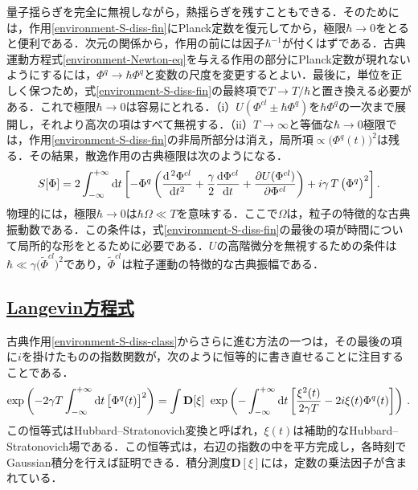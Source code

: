 \documentclass[a4paper,11pt]{ltjsarticle}
\newcommand{\subsectionlink}[1]{\subsection[#1]{\hyperlink{toc}{#1}}}
\def\d{\mathrm{d}}
\def\D{\mathbf{D}}
\begin{document}
量子揺らぎを完全に無視しながら，熱揺らぎを残すこともできる．そのためには，作用\eqref{environment-S-diss-fin}にPlanck定数を復元してから，極限$\hbar\to 0$をとると便利である．次元の関係から，作用の前には因子$\hbar^{-1}$が付くはずである．古典運動方程式\eqref{environment-Newton-eq}を与える作用の部分にPlanck定数が現れないようにするには，$\Phi^{q} \to \hbar
\Phi^{q}$と変数の尺度を変更するとよい．最後に，単位を正しく保つため，式\eqref{environment-S-diss-fin}の最終項で$T\to T/\hbar$と置き換える必要がある．これで極限$\hbar\to 0$は容易にとれる．（i）$U(\Phi^{cl}\pm \hbar\Phi^{q})$を$\hbar\Phi^{q}$の一次まで展開し，それより高次の項はすべて無視する．（ii）$T\to\infty$と等価な$\hbar\to0$極限では，作用\eqref{environment-S-diss-fin}の非局所部分は消え，局所項$\propto \big(\Phi^{q}(t)\big)^2$は残る．その結果，散逸作用の古典極限は次のようになる．
\begin{equation}\label{environment-S-diss-class}
S[\Phi]=2\int_{-\infty}^{+\infty}\d t\left[ -\Phi^{q}\left(
 {\d^{\,2} \Phi^{cl}\over \d t^2}+{\gamma\over 2}{\d
\Phi^{cl}\over \d t}+{\partial U(\Phi^{cl})\over
\partial \Phi^{cl} } \right)+i\gamma\, T\, \big(\Phi^{q}\big)^2 \right].
\end{equation}物理的には，極限$\hbar\to 0$は$\hbar\Omega\ll T$を意味する．ここで$\Omega$は，粒子の特徴的な古典振動数である．この条件は，式\eqref{environment-S-diss-fin}の最後の項が時間について局所的な形をとるために必要である．$U$の高階微分を無視するための条件は$\hbar\ll \gamma  \big(\tilde{\Phi}^{cl}\big)^2$であり，$\tilde\Phi^{cl}$は粒子運動の特徴的な古典振幅である．


\subsectionlink{Langevin方程式}\label{sec_environment-3}


古典作用\eqref{environment-S-diss-class}からさらに進む方法の一つは，その最後の項に$i$を掛けたものの指数関数が，次のように恒等的に書き直せることに注目することである．
\begin{equation}
\exp\left(-2\gamma T\int^{+\infty}_{-\infty}\d
t\,\big[\Phi^{q}(t)\big]^{2}\right)=\int\D[\xi]\
\exp\left(-\int^{+\infty}_{-\infty}\d t\left[{\xi^2(t)\over 2\gamma
T} - 2i \xi(t)\Phi^{q}(t)\right]\right)\, .
\end{equation}この恒等式はHubbard--Stratonovich変換と呼ばれ，$\xi(t)$は補助的なHubbard--Stratonovich場である．この恒等式は，右辺の指数の中を平方完成し，各時刻でGaussian積分を行えば証明できる．積分測度$\D[\xi]$には，定数の乗法因子が含まれている．
\end{document}
